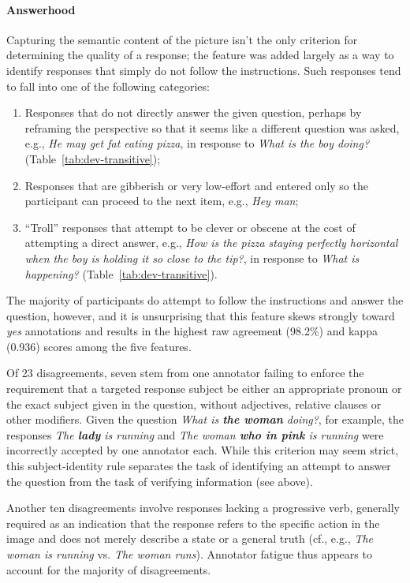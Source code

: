 \paragraph{Answerhood} Capturing the semantic content of the picture isn't the only criterion for determining the quality of a response; the  feature was added largely as a way to identify responses that simply do not follow the instructions. Such responses tend to fall into one of the following categories:

\begin{enumerate}
\item Responses that do not directly answer the given question, perhaps by reframing the perspective so that it seems like a different question was asked, e.g., \textit{He may get fat eating pizza}, in response to \textit{What is the boy doing?} (Table~\ref{tab:dev-transitive});
\item Responses that are gibberish or very low-effort and entered only so the participant can proceed to the next item, e.g., \textit{Hey man};
\item ``Troll'' responses that attempt to be clever or obscene at the cost of attempting a direct answer, e.g., \textit{How is the pizza staying perfectly horizontal when the boy is holding it so close to the tip?}, in response to \textit{What is happening?} (Table~\ref{tab:dev-transitive}).
\end{enumerate}

The majority of participants do attempt to follow the instructions and answer the question, however, and it is unsurprising that this feature skews strongly toward \textit{yes} annotations and results in the highest raw agreement (98.2\%) and kappa (0.936) scores among the five features.

Of 23 disagreements, seven stem from one annotator failing to enforce the requirement that a targeted response subject be either an appropriate pronoun or the exact subject given in the question, without adjectives, relative clauses or other modifiers. Given the question \textit{What is \textbf{the woman} doing?}, for example, the responses \textit{The \textbf{lady} is running} and \textit{The woman \textbf{who in pink} is running} were incorrectly accepted by one annotator each.  While this criterion may seem strict, this subject-identity rule separates the task of identifying an attempt to answer the question from the task of verifying information (see  above).

Another ten disagreements involve responses lacking a progressive verb, generally required as an indication that the response refers to the specific action in the image and does not merely describe a state or a general truth (cf., e.g., \textit{The woman is running} vs. \textit{The woman runs}). Annotator fatigue thus appears to account for the majority of  disagreements.

